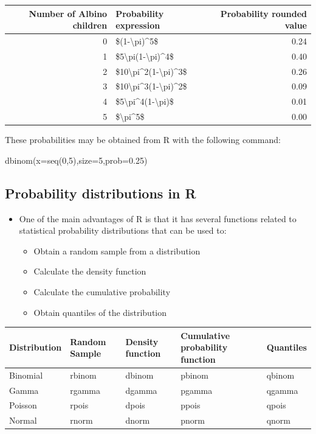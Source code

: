 \documentclass[
]{book}
\providecommand{\tightlist}{%
  \setlength{\itemsep}{0pt}\setlength{\parskip}{0pt}}
\begin{document}
\begin{tabular}{r|l|r}
\hline
Number of Albino children & Probability expression & Probability rounded value\\
\hline
0 & \$(1-\textbackslash{}pi)\textasciicircum{}5\$ & 0.24\\
\hline
1 & \$5\textbackslash{}pi(1-\textbackslash{}pi)\textasciicircum{}4\$ & 0.40\\
\hline
2 & \$10\textbackslash{}pi\textasciicircum{}2(1-\textbackslash{}pi)\textasciicircum{}3\$ & 0.26\\
\hline
3 & \$10\textbackslash{}pi\textasciicircum{}3(1-\textbackslash{}pi)\textasciicircum{}2\$ & 0.09\\
\hline
4 & \$5\textbackslash{}pi\textasciicircum{}4(1-\textbackslash{}pi)\$ & 0.01\\
\hline
5 & \$\textbackslash{}pi\textasciicircum{}5\$ & 0.00\\
\hline
\end{tabular}

These probabilities may be obtained from R with the following command:

dbinom(x=seq(0,5),size=5,prob=0.25)

\hypertarget{probability-distributions-in-r}{%
\subsection{Probability distributions in R}\label{probability-distributions-in-r}}

\begin{itemize}
\tightlist
\item
  One of the main advantages of R is that it has several functions related to statistical probability distributions that can be used to:

  \begin{itemize}
  \tightlist
  \item
    Obtain a random sample from a distribution
  \item
    Calculate the density function
  \item
    Calculate the cumulative probability
  \item
    Obtain quantiles of the distribution
  \end{itemize}
\end{itemize}

\begin{tabular}{l|l|l|l|l}
\hline
Distribution & Random Sample & Density function & Cumulative probability function & Quantiles\\
\hline
Binomial & rbinom & dbinom & pbinom & qbinom\\
\hline
Gamma & rgamma & dgamma & pgamma & qgamma\\
\hline
Poisson & rpois & dpois & ppois & qpois\\
\hline
Normal & rnorm & dnorm & pnorm & qnorm\\
\hline
\end{tabular}
\end{document}
